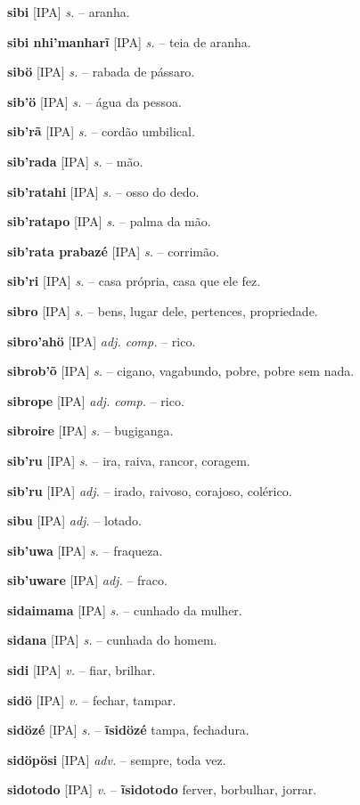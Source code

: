 \textbf{sibi} [IPA] \textit{s.} -- aranha.

\textbf{sibi nhi'manharĩ} [IPA] \textit{s.} -- teia de aranha.

\textbf{sibö} [IPA] \textit{s.} -- rabada de pássaro.

\textbf{sib'ö} [IPA] \textit{s.} -- água da pessoa.

\textbf{sib'rã} [IPA] \textit{s.} -- cordão umbilical.

\textbf{sib'rada} [IPA] \textit{s.} -- mão.

\textbf{sib'ratahi} [IPA] \textit{s.} -- osso do dedo.

\textbf{sib'ratapo} [IPA] \textit{s.} -- palma da mão.

\textbf{sib'rata prabazé} [IPA] \textit{s.} -- corrimão.

\textbf{sib'ri} [IPA] \textit{s.} -- casa própria, casa que ele fez.

\textbf{sibro} [IPA] \textit{s.} -- bens, lugar dele, pertences, propriedade.

\textbf{sibro'ahö} [IPA] \textit{adj. comp.} -- rico.

\textbf{sibrob'õ} [IPA] \textit{s.} -- cigano, vagabundo, pobre, pobre sem nada.

\textbf{sibrope} [IPA] \textit{adj. comp.} -- rico.

\textbf{sibroire} [IPA] \textit{s.} -- bugiganga.

\textbf{sib'ru} [IPA] \textit{s.} -- ira, raiva, rancor, coragem.

\textbf{sib'ru} [IPA] \textit{adj.} -- irado, raivoso, corajoso, colérico.

\textbf{sibu} [IPA] \textit{adj.} -- lotado.

\textbf{sib'uwa} [IPA] \textit{s.} -- fraqueza.

\textbf{sib'uware} [IPA] \textit{adj.} -- fraco.

\textbf{sidaimama} [IPA] \textit{s.} -- cunhado da mulher.

\textbf{sidana} [IPA] \textit{s.} -- cunhada do homem.

\textbf{sidi} [IPA] \textit{v.} -- fiar, brilhar.

\textbf{sidö} [IPA] \textit{v.} -- fechar, tampar.

\textbf{sidözé} [IPA] \textit{s.} -- \textbf{ĩsidözé} tampa, fechadura.

\textbf{sidöpösi} [IPA] \textit{adv.} -- sempre, toda vez.

\textbf{sidotodo} [IPA] \textit{v.} -- \textbf{ĩsidotodo} ferver, borbulhar, jorrar.

